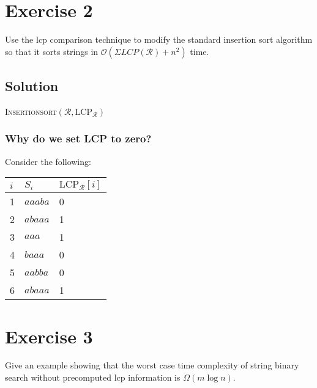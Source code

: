 \documentclass[10pt]{article}
\begin{document}
\section*{Exercise 2}
\color{blue}
Use the lcp comparison technique to modify the standard insertion sort algorithm so that it sorts strings in $\mathcal{O}(\Sigma LCP(\mathcal{R}) + n^2)$ time.
\color{black}

\subsection*{Solution}
\begin{algorithm}
\caption{\textsc{Insertionsort}$(\mathcal{R}, \text{LCP}_{\mathcal{R}})$}
\end{algorithm}
\subsubsection*{Why do we set LCP to zero?}
Consider the following:
\begin{center}
\begin{tabular}{|l|l|l|}
\hline
$i$ & $S_i$ & $\text{LCP}_{\mathcal{R}}[i]$ \\
\hline
1 & $aaaba$ & 0 \\
2 & $abaaa$ & 1 \\
3 & $aaa$     & 1 \\
4 & $baaa$   & 0 \\
5 & $aabba$ & 0 \\
6 & $abaaa$ & 1 \\
\hline
\end{tabular}
\end{center}

\section*{Exercise 3}
\color{blue}
Give an example showing that the worst case time complexity of string binary search without precomputed lcp information is $\Omega(m \log n)$.
\color{black}
\end{document}
